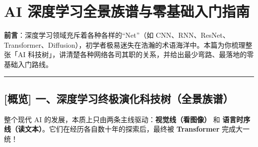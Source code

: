 \chapter{AI 深度学习全景族谱与零基础入门指南}

\begin{noteBox}[核心导读与背景]
\textbf{前言}：深度学习领域充斥着各种各样的“Net”（如 CNN、RNN、ResNet、Transformer、Diffusion），初学者极易迷失在浩瀚的术语海洋中。本篇为你梳理整张「AI 科技树」，讲清楚各种网络各司其职的关系，并给出最少弯路、最落地的零基础入门路线。
\end{noteBox}

\vspace{0.8em}\hrule\vspace{0.8em}

\section{[概览] 一、深度学习终极演化科技树（全景族谱）}

整个现代 AI 的发展，本质上只由两条主线驱动：\textbf{视觉线（看图像）} 和 \textbf{语言时序线（读文本）}。它们在经历各自数十年的探索后，最终被 \textbf{Transformer} 完成大一统！

